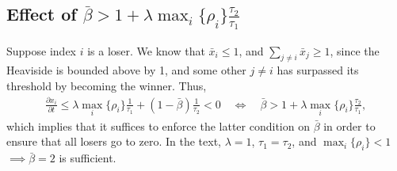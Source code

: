 \documentclass[a4paper]{article}
\begin{document}
\subsection{Effect of $\bar{\beta} > 1 + \lambda \max_i\{\rho_i\} \frac{\tau_2}{\tau_1}$}

Suppose index $i$ is a loser.
We know that $\bar{x}_i \le 1$, and $\sum_{j \ne i} \bar{x}_j \ge 1$, since the Heaviside is bounded above by 1, and some other $j \ne i$ has surpassed its threshold by becoming the winner.
Thus,
\begin{align}
    \frac{{\partial x}_i}{\partial t} \le \lambda \max_i\{\rho_i\} \frac{1}{\tau_1} + \left( 1 - \bar{\beta} \right) \frac{1}{\tau_2} < 0 \quad \iff \quad \bar{\beta} > 1 + \lambda \max_i\{\rho_i\} \frac{\tau_2}{\tau_1} ,
\end{align}
which implies that it suffices to enforce the latter condition on $\bar{\beta}$ in order to ensure that all losers go to zero. 
In the text, $\lambda = 1$, $\tau_1 = \tau_2$, and $\max_i\{\rho_i\} < 1$ $\implies \bar{\beta} = 2$ is sufficient.
\end{document}
